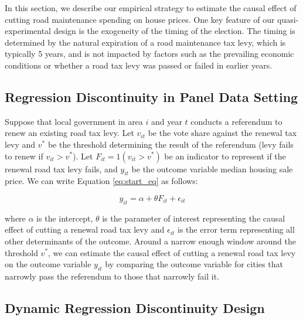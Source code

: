 In this section, we describe our empirical strategy to estimate the causal effect of cutting road maintenance spending on house prices. One key feature of our quasi-experimental design is the exogeneity of the timing of the election. The timing is determined by the natural expiration of a road maintenance tax levy, which is typically 5 years, and is not impacted by factors such as the prevailing economic conditions or whether a road tax levy was passed or failed in earlier years.

\subsection{Regression Discontinuity in Panel Data Setting}

Suppose that local government in area $i$ and year $t$ conducts a referendum to renew an existing road tax levy. Let $v_{it}$ be the vote share against the renewal tax levy and  $v^*$ be the threshold determining the result of the referendum (levy fails to renew if $v_{it} > v^*$). Let $F_{it} = 1(v_{it} > v^*)$ be an indicator to represent if the renewal road tax levy fails, and $y_{it}$ be the outcome variable median housing sale price. We can write Equation \ref{eq:start_eq} as follows:

\begin{equation}
y_{it} = \alpha + \theta F_{it} + \epsilon_{it}
\label{eq:start_eq}
\end{equation}

\noindent where $\alpha$ is the intercept, $\theta$ is the parameter of interest representing the causal effect of cutting a renewal road tax levy and $\epsilon_{it}$ is the error term representing all other determinants of the outcome. Around a narrow enough window around the threshold $v^*$, we can estimate the causal effect of cutting a renewal road tax levy on the outcome variable $y_{it}$ by comparing the outcome variable for cities that narrowly pass the referendum to those that narrowly fail it.

\subsection{Dynamic Regression Discontinuity Design}

